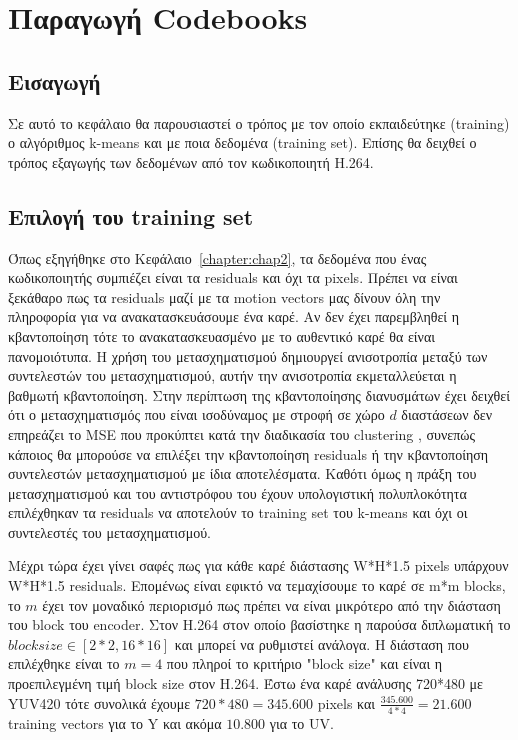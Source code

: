 ﻿\chapter{Παραγωγή Codebooks}
\label{chapter:chap4}

\section{Εισαγωγή}
\label{section:sect41}

\indent Σε αυτό το κεφάλαιο θα παρουσιαστεί ο τρόπος με τον οποίο εκπαιδεύτηκε (training) ο αλγόριθμος k-means  και με ποια δεδομένα (training set). Επίσης θα δειχθεί ο τρόπος εξαγωγής των δεδομένων από τον κωδικοποιητή H.264.

\section{Επιλογή του training set}
\label{section:sect42}

\indent Όπως εξηγήθηκε στο Κεφάλαιο~\ref{chapter:chap2}, τα δεδομένα που ένας κωδικοποιητής συμπιέζει είναι τα residuals και όχι τα pixels. Πρέπει να είναι ξεκάθαρο πως τα residuals μαζί με τα motion vectors μας δίνουν όλη την πληροφορία για να ανακατασκευάσουμε ένα καρέ. Αν δεν έχει παρεμβληθεί η κβαντοποίηση τότε το ανακατασκευασμένο με το αυθεντικό καρέ θα είναι πανομοιότυπα. Η χρήση του μετασχηματισμού δημιουργεί ανισοτροπία μεταξύ των συντελεστών του μετασχηματισμού, αυτήν την ανισοτροπία εκμεταλλεύεται η βαθμωτή κβαντοποίηση. Στην περίπτωση της κβαντοποίησης διανυσμάτων έχει δειχθεί ότι ο μετασχηματισμός που είναι ισοδύναμος με στροφή σε χώρο $d$ διαστάσεων δεν επηρεάζει το MSE που προκύπτει κατά την διαδικασία του clustering \cite{gersho}, συνεπώς κάποιος θα μπορούσε να επιλέξει την κβαντοποίηση residuals ή την κβαντοποίηση συντελεστών μετασχηματισμού με ίδια αποτελέσματα. Καθότι όμως η πράξη του μετασχηματισμού και του αντιστρόφου του έχουν υπολογιστική πολυπλοκότητα επιλέχθηκαν τα residuals να αποτελούν το training set του k-means και όχι οι συντελεστές του μετασχηματισμού.

\indent Μέχρι τώρα έχει γίνει σαφές πως για κάθε καρέ διάστασης W*H*1.5 pixels υπάρχουν W*H*1.5 residuals. Επομένως είναι εφικτό να τεμαχίσουμε το καρέ σε m*m blocks, το $m$ έχει τον μοναδικό περιορισμό πως πρέπει να είναι μικρότερο από την διάσταση του block του encoder. Στον H.264 στον οποίο βασίστηκε η παρούσα διπλωματική το $blocksize\in[2*2,16*16]$ και μπορεί να ρυθμιστεί ανάλογα. Η διάσταση που επιλέχθηκε είναι το $m=4$ που πληροί το κριτήριο "block size" και είναι η προεπιλεγμένη τιμή block size στον H.264. Έστω ένα καρέ ανάλυσης 720*480 με YUV420 τότε συνολικά έχουμε $720*480=345.600$ pixels και $ \frac{345.600}{4*4} = 21.600 $ training vectors για το Y και ακόμα $10.800$ για το UV.

